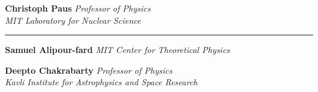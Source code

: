 \vspace{10pt}

\begin{flushright}
\textbf{Christoph Paus}
\vspace{-18pt}
\vspace{-5pt}
{\itshape
Professor of Physics
\\
MIT Laboratory for Nuclear Science
}%
\end{flushright}


\vspace{20pt}
\hrule
\vspace{-5pt}


\begin{flushright}

\vspace{10pt}

\textbf{Samuel Alipour-fard}
\vspace{-18pt}
\vspace{-5pt}
{\itshape
MIT Center for Theoretical Physics}
\end{flushright}

\begin{flushright}

\vspace{10pt}

\textbf{Deepto Chakrabarty}
\vspace{-18pt}
\vspace{-5pt}
{\itshape
Professor of Physics
\\
Kavli Institute for Astrophysics and Space Research
}
\end{flushright}

\cleardoublepage
